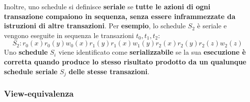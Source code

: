 \documentclass[a4paper]{article}
\begin{document}
	\noindent
	Inoltre, uno schedule si definisce \textcolor{Red3}{\textbf{seriale}} se \textbf{tutte le azioni di ogni transazione compaiono in sequenza, senza essere inframmezzate da istruzioni di altre transazioni}. Per \textcolor{Green4}{\textbf{esempio}}, lo schedule $S_{2}$ è seriale e vengono eseguite in sequenza le transazioni $t_{0}, t_{1}, t_{2}$:
	\begin{equation*}
		S_{2} : r_{0}\left(x\right) r_{0}\left(y\right) w_{0}\left(x\right) r_{1}\left(y\right) r_{1}\left(x\right) w_{1}\left(y\right) r_{2}\left(x\right) r_{2}\left(y\right) r_{2}\left(z\right) w_{2}\left(z\right)
	\end{equation*}
	Uno \textbf{schedule} $S_{i}$ viene identificato come \textcolor{Red3}{\textbf{serializzabile}} se la sua \textbf{esecuzione è corretta quando produce lo stesso risultato prodotto da un qualunque schedule seriale} $S_{j}$ \textbf{delle stesse transazioni}.\newpage
	
	\subsubsection{View-equivalenza}
	
\end{document}
